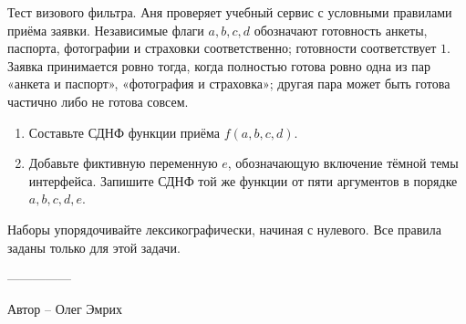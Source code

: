 \question
Тест визового фильтра. Аня проверяет учебный сервис с условными правилами приёма заявки. Независимые флаги $a,b,c,d$ обозначают готовность анкеты, паспорта, фотографии и страховки соответственно; готовности соответствует $1$. Заявка принимается ровно тогда, когда полностью готова ровно одна из пар «анкета и паспорт», «фотография и страховка»; другая пара может быть готова частично либо не готова совсем.
\begin{enumerate}
\item Составьте СДНФ функции приёма $f(a,b,c,d)$.
\item Добавьте фиктивную переменную $e$, обозначающую включение тёмной темы интерфейса. Запишите СДНФ той же функции от пяти аргументов в порядке $a,b,c,d,e$.
\end{enumerate}
Наборы упорядочивайте лексикографически, начиная с нулевого. Все правила заданы только для этой задачи.

---------------

Автор -- Олег Эмрих
